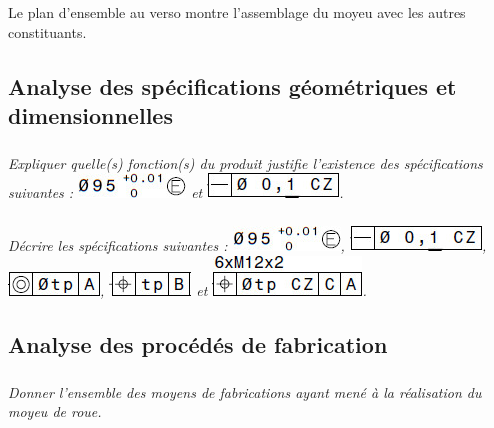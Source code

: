 \documentclass[10pt,fleqn]{article} %
\begin{document}
Le plan d'ensemble au verso montre l'assemblage du moyeu avec les autres constituants. 

\subsection*{Analyse des spécifications géométriques et dimensionnelles}
\subparagraph{}
\textit{Expliquer quelle(s) fonction(s) du produit justifie l'existence des spécifications suivantes :
\includegraphics{images/gps_01} et \includegraphics{images/gps_02}.}


\subparagraph{}
\textit{Décrire les spécifications suivantes :
\includegraphics{images/gps_01}, \includegraphics{images/gps_02}, \includegraphics{images/gps_03}, \includegraphics{images/gps_04} et \includegraphics{images/gps_05}.}

\subsection*{Analyse des procédés de fabrication}
\subparagraph{}
\textit{Donner l'ensemble des moyens de fabrications ayant mené à la réalisation du moyeu de roue.}

\end{document}
